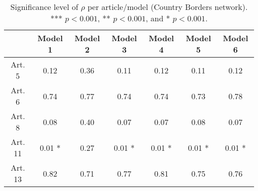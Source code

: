 \begin{table}[ht]
\centering
\begin{tabular}{ccccccc}
  \toprule
 & Model 1 & Model 2 & Model 3 & Model 4 & Model 5 & Model 6 \\ 
  \midrule
Art. 5 & 0.12   & 0.36   & 0.11   & 0.12   & 0.11   & 0.12   \\ 
   \midrule
Art. 6 & 0.74   & 0.77   & 0.74   & 0.74   & 0.73   & 0.78   \\ 
   \midrule
Art. 8 & 0.08   & 0.40   & 0.07   & 0.07   & 0.08   & 0.07   \\ 
   \midrule
Art. 11 & 0.01 * & 0.27   & 0.01 * & 0.01 * & 0.01 * & 0.01 * \\ 
   \midrule
Art. 13 & 0.82   & 0.71   & 0.77   & 0.81   & 0.75   & 0.76   \\ 
   \bottomrule
\end{tabular}
\caption{Significance level of $\rho$ per article/model (Country Borders network). *** $p < 0.001$, ** $p < 0.001$, and * $p < 0.001$.} 
\end{table}
